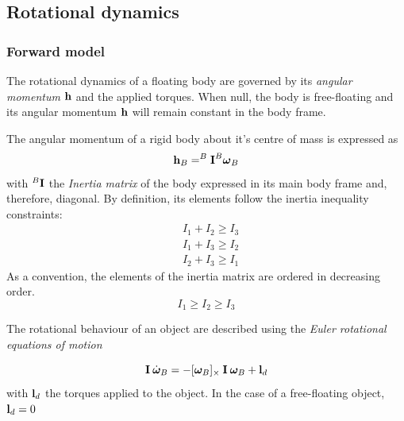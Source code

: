 \subsection{Rotational dynamics}
\subsubsection{Forward model}
The rotational dynamics of a floating body are governed by its \emph{angular momentum} $\boldsymbol{\mathbf{h}}$ and the applied torques. When null, the body is free-floating and its angular momentum $\boldsymbol{\mathbf{h}}$ will remain constant in the body frame.

The angular momentum of a rigid body about it's centre of mass is expressed as
\begin{equation} \label{eq:ang_momentum}
	\boldsymbol{\mathbf{h}}_{B} = ^{B}\boldsymbol{\mathbf{I}} ^{B}\boldsymbol{\mathbf{\omega}}_{B}
\end{equation} with $^{B}\boldsymbol{\mathbf{I}}$ the \emph{Inertia matrix} of the body expressed in its main body frame and, therefore, diagonal. By definition, its elements follow the inertia inequality constraints:
\begin{equation}
	\begin{aligned}
		&I_1+I_2 \geq I_3 \\
		&I_1+I_3 \geq I_2 \\
		&I_2+I_3 \geq I_1
	\end{aligned}
\end{equation} As a convention, the elements of the inertia matrix are ordered in decreasing order.
\begin{equation}
	I_1 \geq I_2 \geq I_3
\end{equation}

The rotational behaviour of an object are described using the \emph{Euler rotational equations of motion} \cite{schaub_analytical_2003}

\begin{equation} \label{eq:euler_eom}
	\boldsymbol{\mathbf{I}} \:\dot{\boldsymbol{\omega}}_{B} =-[{\boldsymbol{\omega}}_{B}]_{\times} \: \boldsymbol{\mathbf{I}} \: \boldsymbol{\omega}_B + \boldsymbol{\mathbf{l}}_{d}
\end{equation} with $\boldsymbol{\mathbf{l}}_{d}$ the torques applied to the object. In the case of a free-floating object, $ \boldsymbol{\mathbf{l}}_{d} = 0$


